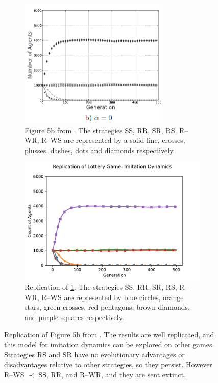\FloatBarrier 
\begin{figure}[!h]
  \begin{subfigure}[b]{0.45\textwidth}
    \includegraphics[width=\textwidth]{images/lottery2.png}
    \caption{Figure 5b from \cite{RN30}. The strategies SS, RR, SR, RS, R--WR, R--WS are represented by a solid line, crosses, plusses, dashes, dots and diamonds respectively. }
    \label{lottery2}
  \end{subfigure}
  \hfill
  \begin{subfigure}[b]{0.45\textwidth}
    \includegraphics[width=1.25\textwidth]{images/lottery2_me.pdf}
    \caption{Replication of \ref{lottery2}. The strategies SS, RR, SR, RS, R--WR, R--WS are represented by blue circles, orange stars, green crosses, red pentagons, brown diamonds, and purple squares respectively.}
    \label{lottery2_me}
  \end{subfigure}
  \caption{Replication of Figure 5b from \cite{RN30}. The results are well replicated, and this model for imitation dynamics can be explored on other games. Strategies RS and SR have no evolutionary advantages or disadvantages relative to other strategies, so they persist. However R--WS $\prec$ SS, RR, and R--WR, and they are sent extinct.} \label{lottery_comp1}
\end{figure} 
\FloatBarrier



